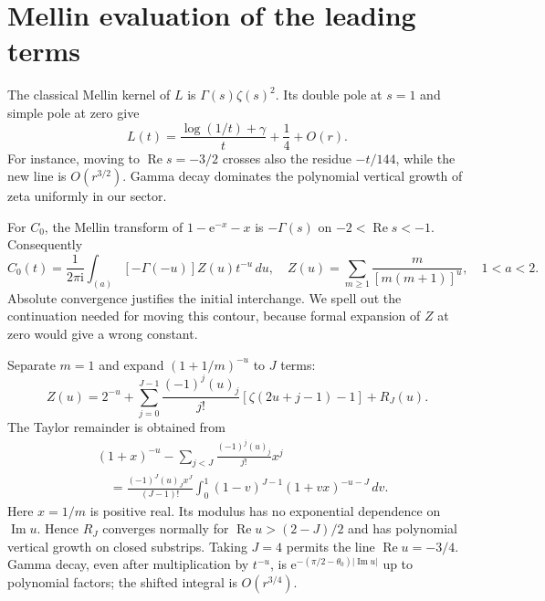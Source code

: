 \documentclass[11pt,letterpaper]{article}
\numberwithin{equation}{section}
\theoremstyle{definition}\newtheorem{definition}[theorem]{Definition}
\theoremstyle{remark}\newtheorem{remark}[theorem]{Remark}
\newcommand{\ii}{\mathrm i}
\newcommand{\ee}{\mathrm e}
\DeclareMathOperator{\Rea}{Re}
\DeclareMathOperator{\Ima}{Im}
\begin{document}
\section{Mellin evaluation of the leading terms}\label{dmv:sum:sec:mellin}
The classical Mellin kernel of $L$ is $\Gamma(s)\zeta(s)^2$. Its double pole at $s=1$ and simple pole at zero give
\begin{equation}\label{dmv:sum:eq:L}
 L(t)=\frac{\log(1/t)+\gamma}{t}+\frac14+O(r).
\end{equation}
For instance, moving to $\Rea s=-3/2$ crosses also the residue $-t/144$, while the new line is $O(r^{3/2})$. Gamma decay dominates the polynomial vertical growth of zeta uniformly in our sector.

For $C_0$, the Mellin transform of $1-\ee^{-x}-x$ is $-\Gamma(s)$ on $-2<\Rea s<-1$. Consequently
\begin{equation}\label{dmv:sum:eq:Cmellin}
 C_0(t)=\frac1{2\pi\ii}\int_{(a)}[-\Gamma(-u)]Z(u)t^{-u}\,du,
 \quad Z(u)=\sum_{m\ge1}\frac{m}{[m(m+1)]^u},\quad 1<a<2.
\end{equation}
Absolute convergence justifies the initial interchange. We spell out the continuation needed for moving this contour, because formal expansion of $Z$ at zero would give a wrong constant.

Separate $m=1$ and expand $(1+1/m)^{-u}$ to $J$ terms:
\begin{equation}\label{dmv:sum:eq:Zcont}
 Z(u)=2^{-u}+\sum_{j=0}^{J-1}\frac{(-1)^j(u)_j}{j!}
                [\zeta(2u+j-1)-1]+R_J(u).
\end{equation}
The Taylor remainder is obtained from
\begin{equation}\label{dmv:sum:eq:Zrem}
\begin{split}
 &(1+x)^{-u}-\sum_{j<J}\frac{(-1)^j(u)_j}{j!}x^j\\
 &\hspace{1em}=\frac{(-1)^J(u)_Jx^J}{(J-1)!}
            \int_0^1(1-v)^{J-1}(1+vx)^{-u-J}\,dv.
\end{split}
\end{equation}
Here $x=1/m$ is positive real. Its modulus has no exponential dependence on $\Ima u$. Hence $R_J$ converges normally for $\Rea u>(2-J)/2$ and has polynomial vertical growth on closed substrips. Taking $J=4$ permits the line $\Rea u=-3/4$. Gamma decay, even after multiplication by $t^{-u}$, is $\ee^{-(\pi/2-\theta_0)|\Ima u|}$ up to polynomial factors; the shifted integral is $O(r^{3/4})$.
\end{document}
